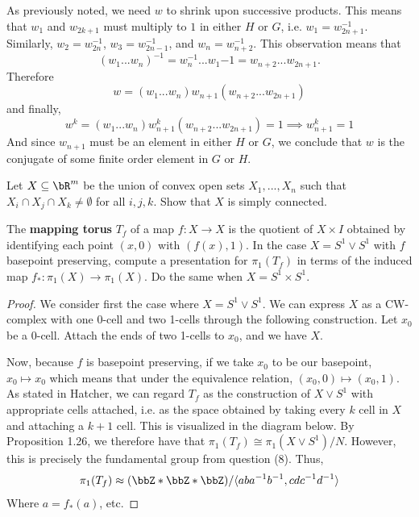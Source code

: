 \begin{homework}[e]
\begin{prf}
    As previously noted, we need $w$ to shrink upon successive products. This means that $w_1$ and $w_{2k+1}$ must multiply to $1$ in either $H$ or $G$, i.e. $w_1 = w_{2n+1}^{-1}$. Similarly, $w_2 = w_{2n}^{-1}$, $w_3 = w_{2n-1}^{-1}$, and $w_n = w_{n+2}^{-1}$. This observation means that 
    \begin{equation*}
        (w_1...w_n)^{-1} = w_n^{-1}...w_1{-1} = w_{n+2}...w_{2n+1}.
    \end{equation*}
    Therefore 
    \begin{equation*}
        w = (w_1...w_n)w_{n+1}(w_{n+2}...w_{2n+1})
    \end{equation*}
    and finally,
    \begin{equation*}
        w^k = (w_1...w_n)w_{n+1}^k(w_{n+2}...w_{2n+1}) = 1 
        \implies w_{n+1}^k = 1
    \end{equation*}
    And since $w_{n+1}$ must be an element in either $H$ or $G$, we conclude that $w$ is the conjugate of some finite order element in $G$ or $H$.


  \end{prf}
   Let $X \subseteq \bR^m$ be the union of convex open sets $X_1,...,X_n$ such that $X_i \cap X_j \cap X_k \neq \emptyset$ for all $i,j,k.$ Show that $X$ is simply connected. 
  \begin{prf}
    
  \end{prf}
   The \textbf{mapping torus} $T_f$ of a map $f:X \rightarrow X$ is the quotient of $X\times I$ obtained by identifying each point $(x,0)$ with $\left(f(x),1\right)$. In the case $X= S^1 \vee S^1$ with $f$ basepoint preserving, compute a presentation for $\pi_1(T_f)$ in terms of the induced map $f_*:\pi_1(X) \rightarrow \pi_1(X)$. Do the same when $X = S^1 \times S^1$.

\begin{proof}
    We consider first the case where $X = S^1 \vee S^1$. We can express $X$ as a CW-complex with one 0-cell and two 1-cells through the following construction. Let $x_0$ be a 0-cell. Attach the ends of two 1-cells to $x_0$, and we have $X$. 
    
    Now, because $f$ is basepoint preserving, if we take $x_0$ to be our basepoint, $x_0 \mapsto x_0$ which means that under the equivalence relation, $(x_0, 0) \mapsto (x_0, 1)$. As stated in Hatcher, we can regard $T_f$ as the construction of $X \vee S^1$ with appropriate cells attached, i.e. as the space obtained by taking every $k$ cell in $X$ and attaching a $k+1$ cell. This is visualized in the diagram below. By Proposition 1.26, we therefore have that $\pi_1(T_f) \cong \pi_1(X \vee S^1)/N$. However, this is precisely the fundamental group from question (8). Thus,
    \begin{equation*}
        \pi_1(T_f) \approx 
        (\bbZ * \bbZ * \bbZ) / 
        \langle aba^{-1}b^{-1}, cdc^{-1}d^{-1} \rangle
    \end{equation*}
    Where $a = f_*(a)$, etc.
    

\end{proof}
\end{homework}
